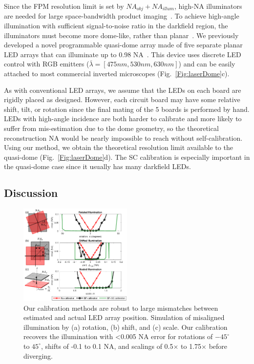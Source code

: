 Since the FPM resolution limit is set by $NA_{obj} + NA_{illum}$, high-NA illuminators are needed for large space-bandwidth product imaging~\cite{Sun2017,Phillips:17}. To achieve high-angle illumination with sufficient signal-to-noise ratio in the darkfield region, the illuminators must become more dome-like, rather than planar~\cite{phillips2015multi}. We previously developed a novel programmable quasi-dome array made of five separate planar LED arrays that can illuminate up to 0.98 NA~\cite{Phillips:17}. This device uses discrete LED control with RGB emitters ($\bar{\lambda}=[475nm, 530nm, 630nm]$) and can be easily attached to most commercial inverted microscopes (Fig.~\ref{Fig:laserDome}c).

As with conventional LED arrays, we assume that the LEDs on each board are rigidly placed as designed. However, each circuit board may have some relative shift, tilt, or rotation since the final mating of the 5 boards is performed by hand. LEDs with high-angle incidence are both harder to calibrate and more likely to suffer from mis-estimation due to the dome geometry, so the theoretical reconstruction NA would be nearly impossible to reach without self-calibration. Using our method, we obtain the theoretical resolution limit available to the quasi-dome (Fig.~\ref{Fig:laserDome}d). The SC calibration is especially important in the quasi-dome case since it usually has many darkfield LEDs.

\subsection{Discussion}
\begin{figure} [t]
	\centering
	\includegraphics[width=0.5\textwidth]{figures/fig_selfcal_fpm_accuracy.pdf}
	\caption{Our calibration methods are robust to large mismatches between estimated and actual LED array position. Simulation of misaligned illumination by (a) rotation, (b) shift, and (c) scale. Our calibration recovers the illumination with <0.005 NA error for rotations of $-45^{\circ}$ to $45^{\circ}$, shifts of -0.1 to 0.1 NA, and scalings of 0.5$\times$ to 1.75$\times$ before diverging.
		}
	\label{Fig:self_cal_fpm_accuracy}
\end{figure}

